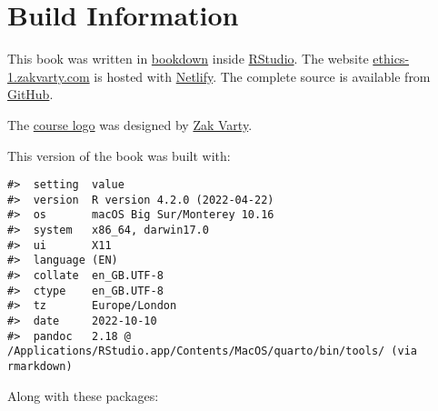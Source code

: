 \documentclass[
]{book}
\theoremstyle{definition}
\theoremstyle{definition}
\theoremstyle{definition}
\theoremstyle{definition}
\theoremstyle{remark}
\begin{document}
\hypertarget{build-information}{%
\chapter*{Build Information}\label{build-information}}

This book was written in \href{http://bookdown.org/}{bookdown} inside \href{http://www.rstudio.com/ide/}{RStudio}. The website \href{https://ethics-1.zakvarty.com}{ethics-1.zakvarty.com} is hosted with \href{https://www.netlify.com}{Netlify}. The complete source is available from \href{https://github.com/zakvarty/ethics-1}{GitHub}.

The \href{assets/ethics-1-logo.png}{course logo} was designed by \href{https://www.zakvarty.com/}{Zak Varty}.

This version of the book was built with:

\begin{verbatim}
#>  setting  value
#>  version  R version 4.2.0 (2022-04-22)
#>  os       macOS Big Sur/Monterey 10.16
#>  system   x86_64, darwin17.0
#>  ui       X11
#>  language (EN)
#>  collate  en_GB.UTF-8
#>  ctype    en_GB.UTF-8
#>  tz       Europe/London
#>  date     2022-10-10
#>  pandoc   2.18 @ /Applications/RStudio.app/Contents/MacOS/quarto/bin/tools/ (via rmarkdown)
\end{verbatim}

Along with these packages:
\end{document}
